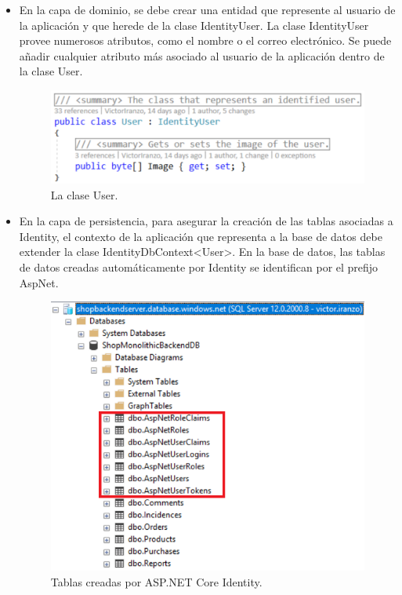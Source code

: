 \documentclass[11pt,spanish,listoffigures]{tfgetsinf}
\begin{document}
\begin{itemize}

\item En la capa de dominio, se debe crear una entidad que represente al usuario de la aplicación y que herede de la clase IdentityUser. La clase IdentityUser provee numerosos atributos, como el nombre o el correo electrónico. Se puede añadir cualquier atributo más asociado al usuario de la aplicación dentro de la clase User.

\begin{figure}[h]
\centering
\includegraphics[scale=0.8]{User}
\caption{La clase User.}
\end{figure}

\item En la capa de persistencia, para asegurar la creación de las tablas asociadas a Identity, el contexto de la aplicación que representa a la base de datos debe extender la clase IdentityDbContext<User>. En la base de datos, las tablas de datos creadas automáticamente por Identity se identifican por el prefijo AspNet.

\begin{figure}[h]
\centering
\includegraphics[scale=0.8]{BDMonolitica}
\caption{Tablas creadas por ASP.NET Core Identity.}
\end{figure}


\end{itemize}
\end{document}
